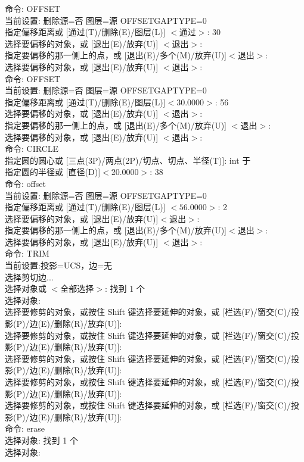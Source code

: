 命令: OFFSET\\
当前设置: 删除源=否  图层=源  OFFSETGAPTYPE=0\\
指定偏移距离或 [通过(T)/删除(E)/图层(L)] $<$通过$>$:  30\\
选择要偏移的对象，或 [退出(E)/放弃(U)] $<$退出$>$:\\
指定要偏移的那一侧上的点，或 [退出(E)/多个(M)/放弃(U)]$<$退出$>$:\\
选择要偏移的对象，或 [退出(E)/放弃(U)] $<$退出$>$:\\
命令:  OFFSET\\
当前设置: 删除源=否  图层=源  OFFSETGAPTYPE=0\\
指定偏移距离或 [通过(T)/删除(E)/图层(L)]$ <$30.0000$>$:  56\\
选择要偏移的对象，或 [退出(E)/放弃(U)] $<$退出$>$:\\
指定要偏移的那一侧上的点，或 [退出(E)/多个(M)/放弃(U)] $<$退出$>$:\\
选择要偏移的对象，或 [退出(E)/放弃(U)] $<$退出$>$:\\
命令: CIRCLE \\
指定圆的圆心或 [三点(3P)/两点(2P)/切点、切点、半径(T)]: int 于\\
指定圆的半径或 [直径(D)]$ <$20.0000$>$: 38\\
命令: offset\\
当前设置: 删除源=否  图层=源  OFFSETGAPTYPE=0\\
指定偏移距离或 [通过(T)/删除(E)/图层(L)] $<56.0000>$:  2\\
选择要偏移的对象，或 [退出(E)/放弃(U)]$ <$退出$>$:\\
指定要偏移的那一侧上的点，或 [退出(E)/多个(M)/放弃(U)]$<$退出$>$:\\
选择要偏移的对象，或 [退出(E)/放弃(U)] $<$退出$>$:\\
命令: TRIM\\
当前设置:投影=UCS，边=无\\
选择剪切边...\\
选择对象或 $<$全部选择$>$:  找到 1 个\\
选择对象:\\
选择要修剪的对象，或按住 Shift 键选择要延伸的对象，或
[栏选(F)/窗交(C)/投影(P)/边(E)/删除(R)/放弃(U)]:\\
选择要修剪的对象，或按住 Shift 键选择要延伸的对象，或
[栏选(F)/窗交(C)/投影(P)/边(E)/删除(R)/放弃(U)]:\\
选择要修剪的对象，或按住 Shift 键选择要延伸的对象，或
[栏选(F)/窗交(C)/投影(P)/边(E)/删除(R)/放弃(U)]:\\
选择要修剪的对象，或按住 Shift 键选择要延伸的对象，或
[栏选(F)/窗交(C)/投影(P)/边(E)/删除(R)/放弃(U)]:\\
选择要修剪的对象，或按住 Shift 键选择要延伸的对象，或
[栏选(F)/窗交(C)/投影(P)/边(E)/删除(R)/放弃(U)]:\\
命令: erase\\
选择对象: 找到 1 个\\
选择对象:\\

